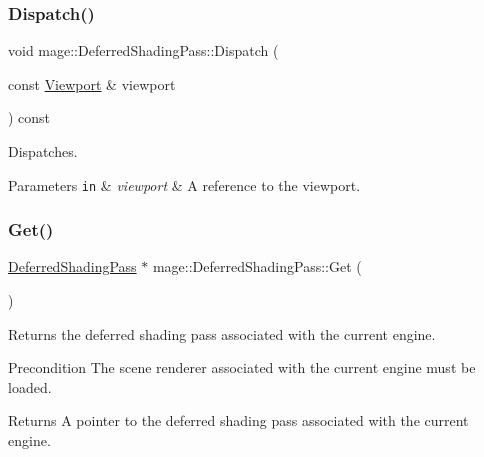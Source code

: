 \subsubsection{\texorpdfstring{Dispatch()}{Dispatch()}}
{\footnotesize\ttfamily void mage\+::\+Deferred\+Shading\+Pass\+::\+Dispatch (\begin{DoxyParamCaption}\item[{const \hyperlink{classmage_1_1_viewport}{Viewport} \&}]{viewport }\end{DoxyParamCaption}) const\hspace{0.3cm}{\ttfamily [noexcept]}}

Dispatches.


\begin{DoxyParams}[1]{Parameters}
\mbox{\tt in}  & {\em viewport} & A reference to the viewport. \\
\hline
\end{DoxyParams}
\hypertarget{classmage_1_1_deferred_shading_pass_a430dec186afda1f40c695b95fe3f7338}{}\label{classmage_1_1_deferred_shading_pass_a430dec186afda1f40c695b95fe3f7338} 
\subsubsection{\texorpdfstring{Get()}{Get()}}
{\footnotesize\ttfamily \hyperlink{classmage_1_1_deferred_shading_pass}{Deferred\+Shading\+Pass} $\ast$ mage\+::\+Deferred\+Shading\+Pass\+::\+Get (\begin{DoxyParamCaption}{ }\end{DoxyParamCaption})\hspace{0.3cm}{\ttfamily [static]}}

Returns the deferred shading pass associated with the current engine.

\begin{DoxyPrecond}{Precondition}
The scene renderer associated with the current engine must be loaded. 
\end{DoxyPrecond}
\begin{DoxyReturn}{Returns}
A pointer to the deferred shading pass associated with the current engine. 
\end{DoxyReturn}
\hypertarget{classmage_1_1_deferred_shading_pass_afcb5b0299030a2a60dcb3685ca875e3e}{}\label{classmage_1_1_deferred_shading_pass_afcb5b0299030a2a60dcb3685ca875e3e} 
